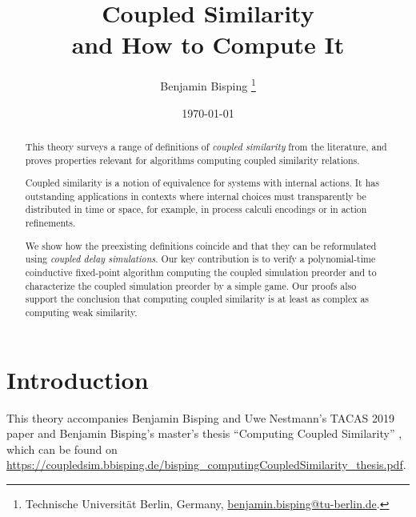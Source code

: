 \documentclass[10pt,a4paper]{article}
\title{ \textbf{Coupled Similarity} \\ \Large and How to Compute It }
\author{ Benjamin Bisping%
  \footnote{Technische Universit\"at Berlin, Germany,
    \href{mailto:benjamin.bisping@tu-berlin.de}{benjamin.bisping@tu-berlin.de}.} }
\date{\today}
\begin{document}
\maketitle

\begin{abstract}
\noindent
This theory surveys a range of definitions of \emph{coupled similarity} from the literature,
and proves properties relevant for algorithms computing coupled similarity relations.

Coupled similarity is a notion of equivalence for systems with internal actions.
It has outstanding applications in contexts where internal choices must transparently be
distributed in time or space, for example, in process calculi encodings or in action refinements.

We show how the preexisting definitions coincide and that they can be reformulated using
\emph{coupled delay simulations}. Our key contribution is to verify a polynomial-time coinductive
fixed-point algorithm computing the coupled simulation preorder and to characterize the
coupled simulation preorder by a simple game. Our proofs also support the conclusion that
computing coupled similarity is at least as complex as computing weak similarity.
\end{abstract}

\tableofcontents

\section{Introduction}

This theory accompanies Benjamin Bisping and Uwe Nestmann's TACAS 2019 paper \cite{bn2019coupledsimTacas}
and Benjamin Bisping's master's thesis ``Computing Coupled Similarity'' \cite{bisping2018coupledsim},
which can be found on \url{https://coupledsim.bbisping.de/bisping_computingCoupledSimilarity_thesis.pdf}.




{}


\end{document}
